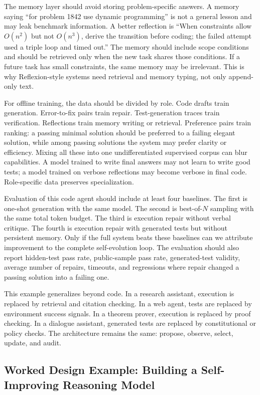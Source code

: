 The memory layer should avoid storing problem-specific answers. A memory saying ``for problem 1842 use dynamic programming'' is not a general lesson and may leak benchmark information. A better reflection is ``When constraints allow $O(n^2)$ but not $O(n^3)$, derive the transition before coding; the failed attempt used a triple loop and timed out.'' The memory should include scope conditions and should be retrieved only when the new task shares those conditions. If a future task has small constraints, the same memory may be irrelevant. This is why Reflexion-style systems need retrieval and memory typing, not only append-only text.

For offline training, the data should be divided by role. Code drafts train generation. Error-to-fix pairs train repair. Test-generation traces train verification. Reflections train memory writing or retrieval. Preference pairs train ranking: a passing minimal solution should be preferred to a failing elegant solution, while among passing solutions the system may prefer clarity or efficiency. Mixing all these into one undifferentiated supervised corpus can blur capabilities. A model trained to write final answers may not learn to write good tests; a model trained on verbose reflections may become verbose in final code. Role-specific data preserves specialization.

Evaluation of this code agent should include at least four baselines. The first is one-shot generation with the same model. The second is best-of-$N$ sampling with the same total token budget. The third is execution repair without verbal critique. The fourth is execution repair with generated tests but without persistent memory. Only if the full system beats these baselines can we attribute improvement to the complete self-evolution loop. The evaluation should also report hidden-test pass rate, public-sample pass rate, generated-test validity, average number of repairs, timeouts, and regressions where repair changed a passing solution into a failing one.

This example generalizes beyond code. In a research assistant, execution is replaced by retrieval and citation checking. In a web agent, tests are replaced by environment success signals. In a theorem prover, execution is replaced by proof checking. In a dialogue assistant, generated tests are replaced by constitutional or policy checks. The architecture remains the same: propose, observe, select, update, and audit.

\subsection{Worked Design Example: Building a Self-Improving Reasoning Model}
\label{subsec:worked-reasoning-model-example}


